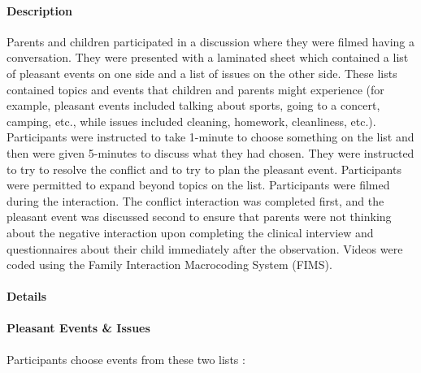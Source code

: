 \documentclass[
]{book}
\begin{document}
\hypertarget{description}{%
\paragraph{Description}\label{description}}

Parents and children participated in a discussion where they were filmed having a conversation. They were presented with a laminated sheet which contained a list of pleasant events on one side and a list of issues on the other side. These lists contained topics and events that children and parents might experience (for example, pleasant events included talking about sports, going to a concert, camping, etc., while issues included cleaning, homework, cleanliness, etc.). Participants were instructed to take 1-minute to choose something on the list and then were given 5-minutes to discuss what they had chosen. They were instructed to try to resolve the conflict and to try to plan the pleasant event. Participants were permitted to expand beyond topics on the list. Participants were filmed during the interaction. The conflict interaction was completed first, and the pleasant event was discussed second to ensure that parents were not thinking about the negative interaction upon completing the clinical interview and questionnaires about their child immediately after the observation. Videos were coded using the Family Interaction Macrocoding System (FIMS)\citep{holmbeck_1995}.

\hypertarget{details}{%
\paragraph{Details}\label{details}}

\hypertarget{pleasant-events-issues}{%
\paragraph{Pleasant Events \& Issues}\label{pleasant-events-issues}}

Participants choose events from these two lists \citep{macphillamy_1982}:
\end{document}

